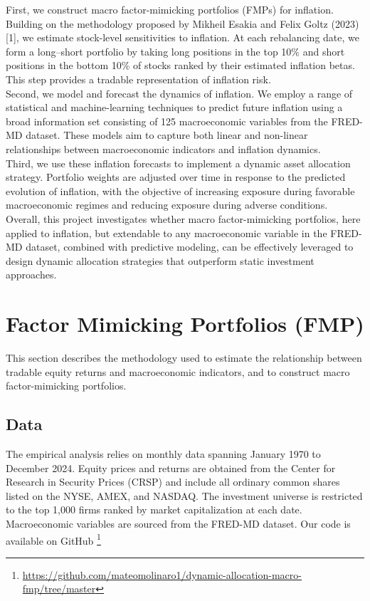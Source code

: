 \documentclass{article}
\begin{document}
First, we construct macro factor-mimicking portfolios (FMPs) for inflation. Building on the methodology proposed by Mikheil Esakia and Felix Goltz (2023)[1], we estimate stock-level sensitivities to inflation. At each rebalancing date, we form a long–short portfolio by taking long positions in the top 10\% and short positions in the bottom 10\% of stocks ranked by their estimated inflation betas. This step provides a tradable representation of inflation risk.\\

Second, we model and forecast the dynamics of inflation. We employ a range of statistical and machine-learning techniques to predict future inflation using a broad information set consisting of 125 macroeconomic variables from the FRED-MD dataset. These models aim to capture both linear and non-linear relationships between macroeconomic indicators and inflation dynamics.\\

Third, we use these inflation forecasts to implement a dynamic asset allocation strategy. Portfolio weights are adjusted over time in response to the predicted evolution of inflation, with the objective of increasing exposure during favorable macroeconomic regimes and reducing exposure during adverse conditions.\\

Overall, this project investigates whether macro factor-mimicking portfolios, here applied to inflation, but extendable to any macroeconomic variable in the FRED-MD dataset, combined with predictive modeling, can be effectively leveraged to design dynamic allocation strategies that outperform static investment approaches.


\section{Factor Mimicking Portfolios (FMP)}

This section describes the methodology used to estimate the relationship between tradable equity returns and macroeconomic indicators, and to construct macro factor-mimicking portfolios.

\subsection{Data}

The empirical analysis relies on monthly data spanning January 1970 to December 2024. Equity prices and returns are obtained from the Center for Research in Security Prices (CRSP) and include all ordinary common shares listed on the NYSE, AMEX, and NASDAQ. The investment universe is restricted to the top 1{,}000 firms ranked by market capitalization at each date. Macroeconomic variables are sourced from the FRED-MD dataset. Our code is available on GitHub \footnote{\url{https://github.com/mateomolinaro1/dynamic-allocation-macro-fmp/tree/master}}
\end{document}

